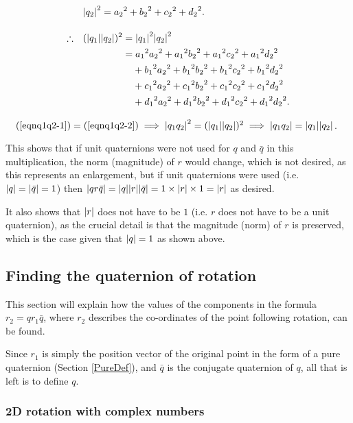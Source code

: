 \documentclass[11pt]{article}
\begin{document}
\begin{alignat}{2}
    & \abs{q_2}^2 = {a_2}^2 + {b_2}^2 + {c_2}^2 + {d_2}^2. \nonumber \\[10pt]
    \therefore \quad & (\abs{q_1}\abs{q_2})^2 = \abs{q_1}^2\abs{q_2}^2 \nonumber \\
             & \phantom{(\abs{q_1}\abs{q_2})^2} = {a_1}^2{a_2}^2 + {a_1}^2{b_2}^2 + {a_1}^2{c_2}^2 + {a_1}^2{d_2}^2 \label{eqnq1q2-2} \\
             & \phantom{(\abs{q_1}\abs{q_2})^2=} + {b_1}^2{a_2}^2 + {b_1}^2{b_2}^2 + {b_1}^2{c_2}^2 + {b_1}^2{d_2}^2 \nonumber \\
             & \phantom{(\abs{q_1}\abs{q_2})^2=} + {c_1}^2{a_2}^2 + {c_1}^2{b_2}^2 + {c_1}^2{c_2}^2 + {c_1}^2{d_2}^2 \nonumber \\
             & \phantom{(\abs{q_1}\abs{q_2})^2=} + {d_1}^2{a_2}^2 + {d_1}^2{b_2}^2 + {d_1}^2{c_2}^2 + {d_1}^2{d_2}^2. \nonumber
\end{alignat}
\endgroup

$\quad (\ref{eqnq1q2-1}) = (\ref{eqnq1q2-2}) \implies \abs{q_1q_2}^2 = (\abs{q_1}\abs{q_2})^2 \implies \abs{q_1q_2} = \abs{q_1}\abs{q_2}$.

This shows that if unit quaternions were not used for $q$ and $\bar{q}$ in this multiplication, the norm (magnitude) of $r$ would change, which is not desired, as this represents an enlargement, but if unit quaternions were used (i.e. $\abs{q} = \abs{\bar{q}} = 1$) then $\abs{qr\bar{q}} = \abs{q}\abs{r}\abs{\bar{q}} = 1\times\abs{r}\times1 = \abs{r}$ as desired.

It also shows that $\abs{r}$ does not have to be $1$ (i.e. $r$ does not have to be a unit quaternion), as the crucial detail is that the magnitude (norm) of $r$ is preserved, which is the case given that $\abs{q} = 1$ as shown above.

\subsection{Finding the quaternion of rotation}

This section will explain how the values of the components in the formula $r_2 = qr_1\bar{q}$, where $r_2$ describes the co-ordinates of the point following rotation, can be found.

Since $r_1$ is simply the position vector of the original point in the form of a pure quaternion (Section \ref{PureDef}), and $\bar{q}$ is the conjugate quaternion of $q$, all that is left is to define $q$.

\subsubsection{2D rotation with complex numbers}
\end{document}
